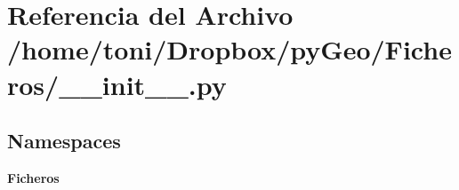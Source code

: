 \section{Referencia del Archivo /home/toni/\-Dropbox/py\-Geo/\-Ficheros/\-\_\-\-\_\-init\-\_\-\-\_\-.py}
\label{Ficheros_2____init_____8py}
\subsection*{Namespaces}
\begin{DoxyCompactItemize}
\item 
{\bf Ficheros}
\end{DoxyCompactItemize}
